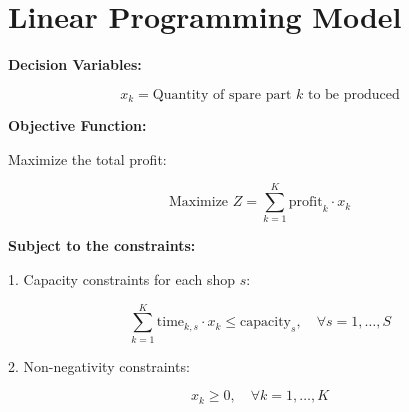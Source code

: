 \documentclass{article}
\begin{document}
\section*{Linear Programming Model}

\textbf{Decision Variables:}

\[
x_k = \text{Quantity of spare part } k \text{ to be produced}
\]

\textbf{Objective Function:}

Maximize the total profit:

\[
\text{Maximize } Z = \sum_{k=1}^{K} \text{profit}_{k} \cdot x_k
\]

\textbf{Subject to the constraints:}

1. Capacity constraints for each shop \( s \):

\[
\sum_{k=1}^{K} \text{time}_{k, s} \cdot x_k \leq \text{capacity}_{s}, \quad \forall s = 1, \ldots, S
\]

2. Non-negativity constraints:

\[
x_k \geq 0, \quad \forall k = 1, \ldots, K
\]
\end{document}
